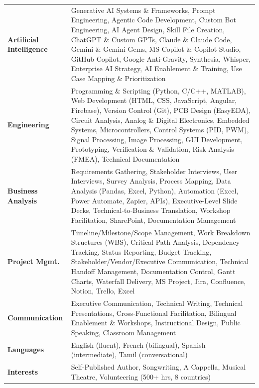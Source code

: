 \documentclass[a4paper,10pt]{article}
\begin{document}
\begin{tabularx}{\linewidth}{@{}l X@{}}
  \textbf{Artificial Intelligence} &
  \normalsize{Generative AI Systems \& Frameworks, Prompt Engineering, Agentic Code Development, Custom Bot Engineering, AI Agent Design, Skill File Creation, ChatGPT \& Custom GPTs, Claude \& Claude Code, Gemini \& Gemini Gems, MS Copilot \& Copilot Studio, GitHub Copilot, Google Anti-Gravity, Synthesia, Whisper, Enterprise AI Strategy, AI Enablement \& Training, Use Case Mapping \& Prioritization} \\
  \textbf{Engineering} &
  \normalsize{Programming \& Scripting (Python, C/C++, MATLAB), Web Development (HTML, CSS, JavaScript, Angular, Firebase), Version Control (Git), PCB Design (EasyEDA), Circuit Analysis, Analog \& Digital Electronics, Embedded Systems, Microcontrollers, Control Systems (PID, PWM), Signal Processing, Image Processing, GUI Development, Prototyping, Verification \& Validation, Risk Analysis (FMEA), Technical Documentation} \\
  \textbf{Business Analysis} &
  \normalsize{Requirements Gathering, Stakeholder Interviews, User Interviews, Survey Analysis, Process Mapping, Data Analysis (Pandas, Excel, Python), Automation (Excel, Power Automate, Zapier, APIs), Executive-Level Slide Decks, Technical-to-Business Translation, Workshop Facilitation, SharePoint, Documentation Management} \\
  \textbf{Project Mgmt.} &
  \normalsize{Timeline/Milestone/Scope Management, Work Breakdown Structures (WBS), Critical Path Analysis, Dependency Tracking, Status Reporting, Budget Tracking, Stakeholder/Vendor/Executive Communication, Technical Handoff Management, Documentation Control, Gantt Charts, Waterfall Delivery, MS Project, Jira, Confluence, Notion, Trello, Excel} \\
  \textbf{Communication} &
  \normalsize{Executive Communication, Technical Writing, Technical Presentations, Cross-Functional Facilitation, Bilingual Enablement \& Workshops, Instructional Design, Public Speaking, Classroom Management} \\
  \textbf{Languages} &
  \normalsize{English (fluent), French (bilingual), Spanish (intermediate), Tamil (conversational)} \\
  \textbf{Interests} &
  \normalsize{Self-Published Author, Songwriting, A Cappella, Musical Theatre, Volunteering (500+ hrs, 8 countries)} \\
\end{tabularx}

\end{document}
